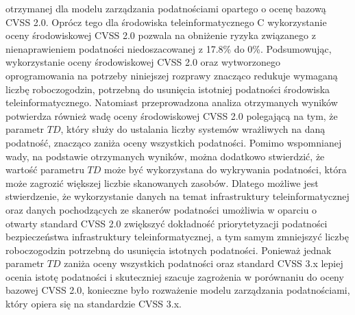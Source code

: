 otrzymanej dla modelu zarządzania podatnościami opartego o ocenę bazową CVSS 2.0. Oprócz tego dla środowiska teleinformatycznego C wykorzystanie oceny środowiskowej CVSS 2.0 pozwala na obniżenie ryzyka związanego z nienaprawieniem podatności niedoszacowanej z 17.8\% do 0\%. Podsumowując, wykorzystanie oceny środowiskowej CVSS 2.0 oraz wytworzonego oprogramowania na potrzeby niniejszej rozprawy znacząco redukuje wymaganą liczbę roboczogodzin, potrzebną do usunięcia istotniej podatności środowiska teleinformatycznego. Natomiast przeprowadzona analiza otrzymanych wyników potwierdza również wadę oceny środowiskowej CVSS 2.0 polegającą na tym, że parametr $TD$, który służy do ustalania liczby systemów wrażliwych na daną podatność, znacząco zaniża oceny wszystkich podatności. Pomimo wspomnianej wady, na podstawie otrzymanych wyników, można dodatkowo stwierdzić, że wartość parametru $TD$ może być wykorzystana do wykrywania podatności, która może zagrozić większej liczbie skanowanych zasobów. Dlatego możliwe jest stwierdzenie, że wykorzystanie danych na temat infrastruktury teleinformatycznej oraz danych pochodzących ze skanerów podatności umożliwia w oparciu o otwarty standard CVSS 2.0 zwiększyć dokładność priorytetyzacji podatności bezpieczeństwa infrastruktury teleinformatycznej, a tym samym zmniejszyć liczbę roboczogodzin potrzebną do usunięcia istotnych podatności. Ponieważ jednak parametr $TD$ zaniża oceny wszystkich podatności oraz standard CVSS 3.x lepiej ocenia istotę podatności i skuteczniej szacuje zagrożenia \cite{fall2019common, Nowak-cldd-2021, Nowa2109Conversion} w porównaniu do oceny bazowej CVSS 2.0, konieczne było rozważenie modelu zarządzania podatnościami, który opiera się na standardzie CVSS 3.x. 

